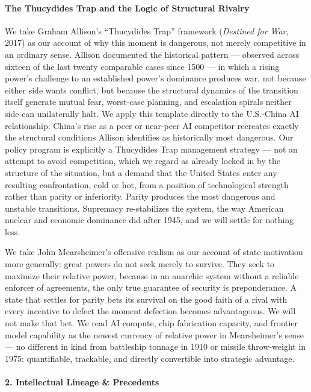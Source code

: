 \paragraph{The Thucydides Trap and the Logic of Structural
Rivalry}\label{the-thucydides-trap-and-the-logic-of-structural-rivalry}

We take Graham Allison's ``Thucydides Trap'' framework (\emph{Destined
for War}, 2017) as our account of why this moment is dangerous, not
merely competitive in an ordinary sense. Allison documented the
historical pattern --- observed across sixteen of the last twenty
comparable cases since 1500 --- in which a rising power's challenge to
an established power's dominance produces war, not because either side
wants conflict, but because the structural dynamics of the transition
itself generate mutual fear, worst-case planning, and escalation spirals
neither side can unilaterally halt. We apply this template directly to
the U.S.-China AI relationship: China's rise as a peer or near-peer AI
competitor recreates exactly the structural conditions Allison
identifies as historically most dangerous. Our policy program is
explicitly a Thucydides Trap management strategy --- not an attempt to
avoid competition, which we regard as already locked in by the structure
of the situation, but a demand that the United States enter any
resulting confrontation, cold or hot, from a position of technological
strength rather than parity or inferiority. Parity produces the most
dangerous and unstable transitions. Supremacy re-stabilizes the system,
the way American nuclear and economic dominance did after 1945, and we
will settle for nothing less.

We take John Mearsheimer's offensive realism as our account of state
motivation more generally: great powers do not seek merely to survive.
They seek to maximize their relative power, because in an anarchic
system without a reliable enforcer of agreements, the only true
guarantee of security is preponderance. A state that settles for parity
bets its survival on the good faith of a rival with every incentive to
defect the moment defection becomes advantageous. We will not make that
bet. We read AI compute, chip fabrication capacity, and frontier model
capability as the newest currency of relative power in Mearsheimer's
sense --- no different in kind from battleship tonnage in 1910 or
missile throw-weight in 1975: quantifiable, trackable, and directly
convertible into strategic advantage.

\paragraph{2. Intellectual Lineage \&
Precedents}\label{intellectual-lineage-precedents-21}

